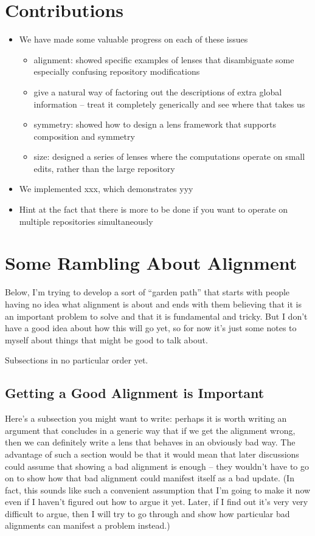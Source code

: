 \section{Contributions}
\label{sec:contributions}
\begin{itemize}
    \item We have made some valuable progress on each of these issues
        \begin{itemize}
            \item alignment: showed specific examples of lenses that
                disambiguate some especially confusing repository
                modifications
            \item give a natural way of factoring out the descriptions of
                extra global information -- treat it completely generically
                and see where that takes us
            \item symmetry: showed how to design a lens framework that
                supports composition and symmetry
            \item size: designed a series of lenses where the computations
                operate on small edits, rather than the large repository
        \end{itemize}
    \item We implemented xxx, which demonstrates yyy
    \item Hint at the fact that there is more to be done if you want to
        operate on multiple repositories simultaneously
\end{itemize}
\section{Some Rambling About Alignment}
Below, I'm trying to develop a sort of ``garden path'' that starts with
people having no idea what alignment is about and ends with them believing
that it is an important problem to solve and that it is fundamental and
tricky. But I don't have a good idea about how this will go yet, so for now
it's just some notes to myself about things that might be good to talk
about.

Subsections in no particular order yet.

\subsection{Getting a Good Alignment is Important}
Here's a subsection you might want to write: perhaps it is worth writing an
argument that concludes in a generic way that if we get the alignment wrong,
then we can definitely write a lens that behaves in an obviously bad way.
The advantage of such a section would be that it would mean that later
discussions could assume that showing a bad alignment is enough -- they
wouldn't have to go on to show how that bad alignment could manifest itself
as a bad update. (In fact, this sounds like such a convenient assumption
that I'm going to make it now even if I haven't figured out how to argue it
yet. Later, if I find out it's very very difficult to argue, then I will try
to go through and show how particular bad alignments can manifest a problem
instead.)

